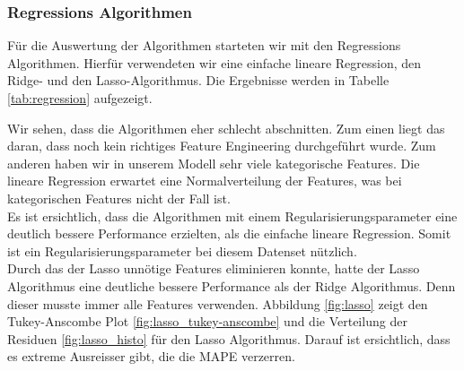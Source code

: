 \subsubsection{Regressions Algorithmen}
Für die Auswertung der Algorithmen starteten wir mit den Regressions Algorithmen. Hierfür verwendeten wir eine  einfache lineare Regression, den Ridge- und den Lasso-Algorithmus. Die Ergebnisse werden in Tabelle \ref{tab:regression} aufgezeigt.

\begin{table}[h]
\centering
{}
\caption{Ergebnisse der Regression Algorithmen}
\label{tab:regression}
\end{table}

Wir sehen, dass die Algorithmen eher schlecht abschnitten. Zum einen liegt das daran, dass noch kein richtiges Feature Engineering durchgeführt wurde. Zum anderen haben wir in unserem Modell sehr viele kategorische Features. Die lineare Regression erwartet eine Normalverteilung der Features, was bei kategorischen Features nicht der Fall ist.\\
Es ist ersichtlich, dass die Algorithmen mit einem Regularisierungsparameter eine deutlich bessere Performance erzielten, als die einfache lineare Regression. Somit ist ein Regularisierungsparameter bei diesem Datenset nützlich.\\
Durch das der Lasso unnötige Features eliminieren konnte, hatte der Lasso Algorithmus eine deutliche bessere Performance als der Ridge Algorithmus. Denn dieser musste immer alle Features verwenden. Abbildung \ref{fig:lasso} zeigt den Tukey-Anscombe Plot \ref{fig:lasso_tukey-anscombe} und die Verteilung der Residuen \ref{fig:lasso_histo} für den Lasso Algorithmus. Darauf ist ersichtlich, dass es extreme Ausreisser gibt, die die MAPE verzerren.

